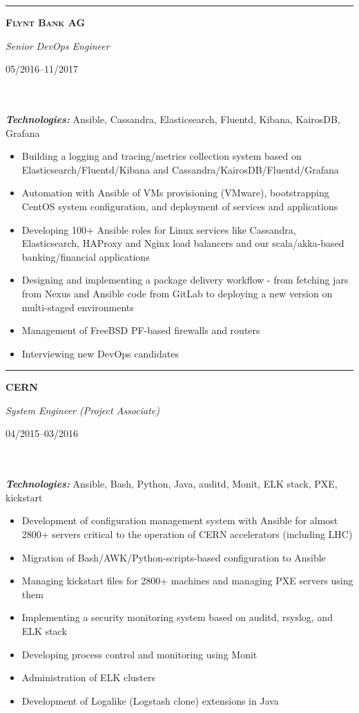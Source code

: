 \documentclass[$fontsize$, a4paper]{article}
\newcommand\textbox[1]{%
  \parbox{.333\textwidth}{#1}%
}
\begin{document}
\noindent\rule[0.5ex]{\linewidth}{1pt}

\noindent\textbox{\textbf{\textsc{Flynt Bank AG}}\hfill}\textbox{\hfil \emph{Senior DevOps Engineer}\hfil}\textbox{\hfill 05/2016--11/2017}\\\\
\textbf{\textit{Technologies:}} Ansible, Cassandra, Elasticsearch, Fluentd, Kibana, KairosDB, Grafana

\vspace{1pt}
\begin{itemize}
  \setlength\itemsep{-0.2em}
  \item Building a logging and tracing/metrics collection system based on Elasticsearch/Fluentd/Kibana and Cassandra/KairosDB/Fluentd/Grafana
  \item Automation with Ansible of VMs provisioning (VMware), bootstrapping CentOS system configuration, and deployment of services and applications
  \item Developing 100+ Ansible roles for Linux services like Cassandra, Elasticsearch, HAProxy and Nginx load balancers and our scala/akka-based banking/financial applications
  \item Designing and implementing a package delivery workflow - from fetching jars from Nexus and Ansible code from GitLab to deploying a new version on multi-staged environments
  \item Management of FreeBSD PF-based firewalls and routers
  \item Interviewing new DevOps candidates
\end{itemize}


\noindent\rule[0.5ex]{\linewidth}{1pt}


\noindent\textbox{\textbf{\textsc{CERN}}\hfill}\textbox{\hfil \emph{System Engineer (Project Associate)}\hfil}\textbox{\hfill 04/2015--03/2016}\\\\
\textbf{\textit{Technologies:}} Ansible, Bash, Python, Java, auditd, Monit, ELK stack, PXE, kickstart

\vspace{1pt}
\begin{itemize}
  \setlength\itemsep{-0.2em}
  \item Development of configuration management system with Ansible for almost 2800+ servers critical to the operation of CERN accelerators (including LHC)
  \item Migration of Bash/AWK/Python-scripts-based configuration to Ansible
  \item Managing kickstart files for 2800+ machines and managing PXE servers using them
  \item Implementing a security monitoring system based on auditd, rsyslog, and ELK stack
  \item Developing process control and monitoring using Monit
  \item Administration of ELK clusters
  \item Development of Logalike (Logstash clone) extensions in Java
\end{itemize}
\end{document}
